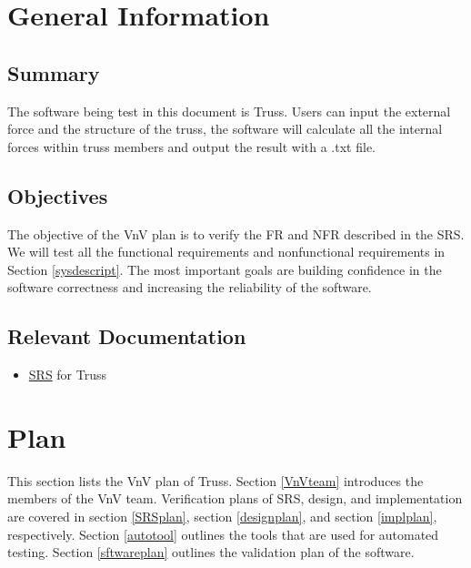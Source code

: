 \documentclass[12pt, titlepage]{article}
\begin{document}
\section{General Information} \label{Geninf}

\subsection{Summary}

The software being test in this document is Truss. Users can input the external 
force and the structure of the truss, the software will calculate all the 
internal forces within truss members and output the result with a .txt file. 


\subsection{Objectives}
The objective of the VnV plan is to verify the FR and NFR described in the SRS. 
We will test all the functional requirements and nonfunctional requirements in 
Section \ref{sysdescript}. The most important goals are building confidence 
in the software correctness and increasing the reliability of the software. 

\subsection{Relevant Documentation}

\begin{itemize}
	\item 
	\href{https://github.com/tingyuw/cas741/blob/master/docs/SRS/SRS.pdf}{SRS} 
	for Truss
\end{itemize}


\section{Plan} \label{verplan}
This section lists the VnV plan of Truss. Section \ref{VnVteam} introduces the 
members of the VnV team. Verification plans of SRS, design, and implementation 
are covered in section \ref{SRSplan}, section \ref{designplan}, and section 
\ref{implplan}, respectively. Section \ref{autotool} outlines the tools that 
are used for automated testing. Section \ref{sftwareplan} outlines the 
validation plan of the software.
\end{document}
